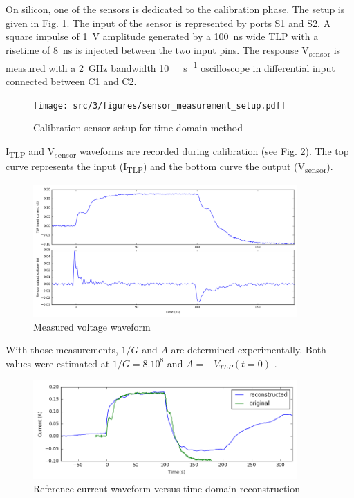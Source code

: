 On silicon, one of the sensors is dedicated to the calibration phase.
The setup is given in Fig. \ref{fig:calibration-sensor}.
The input of the sensor is represented by ports S1 and S2.
A square impulse of \SI{1}{\volt} amplitude generated by a \SI{100}{\nano\second} wide TLP with a risetime of \SI{8}{\nano\second} is injected between the two input pins.
The response V\textsubscript{sensor} is measured with a \SI{2}{\giga\hertz} bandwidth \SI{10}{\giga\sample\per\second} oscilloscope in differential input connected between C1 and C2.

\begin{figure}[!h]
  \centering
  \texttt{[image: src/3/figures/sensor\_measurement\_setup.pdf]}
  \caption{Calibration sensor setup for time-domain method}
  \label{fig:calibration-sensor}
\end{figure}

I\textsubscript{TLP} and V\textsubscript{sensor} waveforms are recorded during calibration (see Fig. \ref{fig:measurement-nfs}).
The top curve represents the input (I\textsubscript{TLP}) and the bottom curve the output (V\textsubscript{sensor}).

\begin{figure}[!h]
  \centering
  \includegraphics[width=0.9\textwidth]{src/3/figures/measured_waveform.png}
  \caption{Measured voltage waveform}
  \label{fig:measurement-nfs}
\end{figure}

With those measurements, $1/G$ and $A$ are determined experimentally.
Both values were estimated at $1/G = 8.10^8$ and $A = -V_{TLP}(t = 0)$ .

\begin{figure}[!h]
  \centering
  \includegraphics[width=0.9\textwidth]{src/3/figures/time_domain_vs_ref.png}
  \caption{Reference current waveform versus time-domain reconstruction}
  \label{fig:time-domain-reconstructed}
\end{figure}

